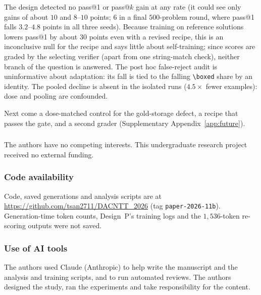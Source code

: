 \documentclass[runningheads]{llncs}
\begin{document}
The design detected no pass@1 or pass@$k$ gain at any rate (it could see only gains of about
$10$ and $8$--$10$ points; $6$ in a final $500$-problem round, where pass@1 falls $3.2$--$4.8$ points in
all three seeds). Because training on reference solutions lowers pass@1 by about $30$ points even with a
revised recipe, this is an inconclusive null for the recipe and says little about self-training; since scores are
graded by the selecting verifier (apart from one string-match check), neither branch of the question is answered. The post hoc false-reject audit is uninformative about
adaptation: its fall is tied to the falling \verb|\boxed| share by an identity. The pooled decline is absent in the isolated runs ($4.5\times$ fewer examples): dose and
pooling are confounded.

Next come a dose-matched control for the gold-storage defect, a recipe that passes the
gate, and a second grader (Supplementary Appendix~\ref{app:future}).

\begin{credits}
\subsubsection{\discintname}
The authors have no competing interests. This undergraduate research project
received no external funding.

\subsubsection{Code availability}
Code, saved generations and analysis scripts are at
\url{https://github.com/tsan2711/DACNTT_2026} (tag \texttt{paper-2026-11b}). Generation-time token counts, Design~P's training logs and the
$1{,}536$-token re-scoring outputs were not saved.

\subsubsection{Use of AI tools}
The authors used Claude (Anthropic) to help write the manuscript and the analysis
and training scripts, and to run automated reviews. The authors designed the study, ran the experiments
and take responsibility for the content.
\end{credits}
\end{document}

